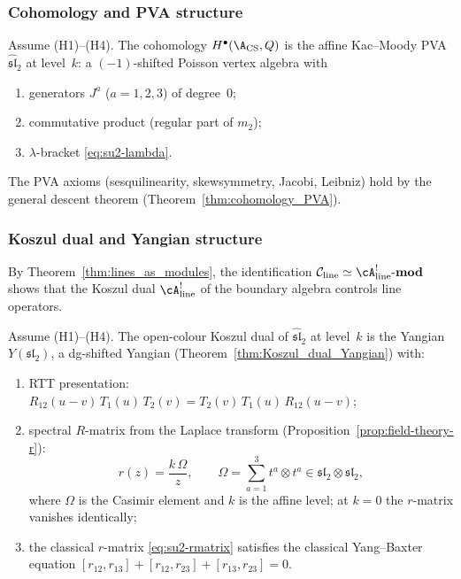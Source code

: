 \subsubsection{Cohomology and PVA structure}

\begin{theorem}
Assume \textrm{(H1)--(H4)}. The cohomology
$H^\bullet(\A_{\text{CS}}, Q)$ is the affine Kac--Moody PVA
$\widehat{\mathfrak{sl}}_2$ at level~$k$: a
$(-1)$-shifted Poisson vertex algebra with
\begin{enumerate}[label=\textup{(\roman*)}]
\item generators $J^a$ ($a = 1,2,3$) of degree~$0$;
\item commutative product (regular part of $m_2$);
\item $\lambda$-bracket \eqref{eq:su2-lambda}.
\end{enumerate}
The PVA axioms (sesquilinearity, skewsymmetry, Jacobi, Leibniz)
hold by the general descent theorem
(Theorem~\ref{thm:cohomology_PVA}).
\end{theorem}

\subsubsection{Koszul dual and Yangian structure}

By Theorem~\ref{thm:lines_as_modules}, the identification
$\mathcal{C}_{\mathrm{line}} \simeq \cA^!_{\mathrm{line}}\text{-}\mathbf{mod}$
shows that the Koszul dual
$\cA^!_{\mathrm{line}}$ of the boundary algebra controls line operators.

\begin{theorem}
Assume \textrm{(H1)--(H4)}. The open-colour Koszul dual of
$\widehat{\mathfrak{sl}}_2$ at level~$k$ is the Yangian
$Y(\mathfrak{sl}_2)$, a dg-shifted Yangian
(Theorem~\ref{thm:Koszul_dual_Yangian}) with:
\begin{enumerate}[label=\textup{(\roman*)}]
\item RTT presentation: $R_{12}(u-v)\, T_1(u)\, T_2(v)
 = T_2(v)\, T_1(u)\, R_{12}(u-v)$;
\item spectral $R$-matrix from the Laplace transform
 (Proposition~\ref{prop:field-theory-r}):
 \begin{equation}%
 r(z) = \frac{k\,\Omega}{z},
 \qquad
 \Omega = \sum_{a=1}^3 t^a \otimes t^a
 \in \mathfrak{sl}_2 \otimes \mathfrak{sl}_2,
 \end{equation}
 where $\Omega$ is the Casimir element and $k$ is the affine level; at $k = 0$ the $r$-matrix vanishes identically;
\item the classical $r$-matrix \eqref{eq:su2-rmatrix} satisfies
 the classical Yang--Baxter equation
 $[r_{12}, r_{13}] + [r_{12}, r_{23}] + [r_{13}, r_{23}] = 0$.
\end{enumerate}
\end{theorem}

